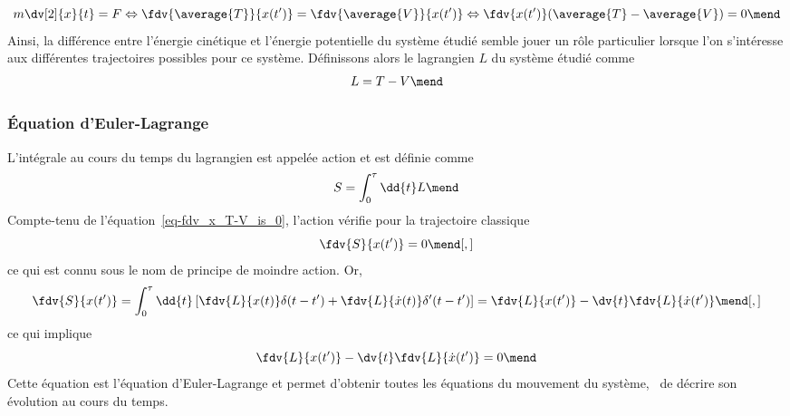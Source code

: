 \begin{equation}
m\dv[2]{x}{t} = F
\Leftrightarrow
\fdv{\average{T}}{x(t')} = \fdv{\average{V}}{x(t')}
\Leftrightarrow
\fdv{x(t')}(\average{T}-\average{V}) = 0 \label{eq-fdv_x_T-V_is_0}
\mend
\end{equation}
Ainsi, la différence entre l'énergie cinétique et l'énergie potentielle du système étudié semble jouer un rôle particulier lorsque l'on s'intéresse aux différentes trajectoires possibles pour ce système. Définissons alors le lagrangien $L$ du système étudié comme
\begin{equation}
L = T-V
\mend
\end{equation}
\subsubsection{Équation d'Euler-Lagrange}\label{chapter-MS-MSSM-section-formalisme-subsec-into_lagrangien-subsubsec-euler-lagrange}
L'intégrale au cours du temps du lagrangien est appelée action et est définie comme
\begin{equation}
S = \int_0^\tau\dd{t}L
\mend
\end{equation}
Compte-tenu de l'équation~\eqref{eq-fdv_x_T-V_is_0}, l'action vérifie pour la trajectoire classique
\begin{equation}
\fdv{S}{x(t')}=0
\mend[,]
\end{equation}
ce qui est connu sous le nom de principe de moindre action. Or,
\begin{equation}
\fdv{S}{x(t')}
= \int_0^\tau\dd{t} \left[ \fdv{L}{x(t)}\delta(t-t') + \fdv{L}{\dot{x}(t)}\delta'(t-t')\right]
= \fdv{L}{x(t')} - \dv{t}\fdv{L}{\dot{x}(t')}
\mend[,]
\end{equation}
ce qui implique
\begin{equation}
\fdv{L}{x(t')} - \dv{t}\fdv{L}{\dot{x}(t')} = 0
\mend
\end{equation}
Cette équation est l'équation d'Euler-Lagrange et permet d'obtenir toutes les équations du mouvement du système, \ie\ de décrire son évolution au cours du temps.

